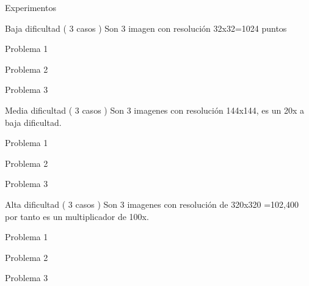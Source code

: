 \documentclass[
  spanish,
  ignorenonframetext,
]{beamer}
\begin{document}
\begin{frame}[fragile]{Experimentos}
\protect\hypertarget{experimentos}{}
\begin{block}{Baja dificultad ( 3 casos )}
\protect\hypertarget{baja-dificultad-3-casos}{}
Son 3 imagen con resolución 32x32=1024 puntos

\begin{block}{Problema 1}
\protect\hypertarget{problema-1}{}
\end{block}

\begin{block}{Problema 2}
\protect\hypertarget{problema-2}{}
\end{block}

\begin{block}{Problema 3}
\protect\hypertarget{problema-3}{}
\end{block}
\end{block}

\begin{block}{Media dificultad ( 3 casos )}
\protect\hypertarget{media-dificultad-3-casos}{}
Son 3 imagenes con resolución 144x144, es un 20x a baja dificultad.

\begin{block}{Problema 1}
\protect\hypertarget{problema-1-1}{}
\end{block}

\begin{block}{Problema 2}
\protect\hypertarget{problema-2-1}{}
\end{block}

\begin{block}{Problema 3}
\protect\hypertarget{problema-3-1}{}
\end{block}
\end{block}

\begin{block}{Alta dificultad ( 3 casos )}
\protect\hypertarget{alta-dificultad-3-casos}{}
Son 3 imagenes con resolución de 320x320 =102,400 por tanto es un
multiplicador de 100x.

\begin{block}{Problema 1}
\protect\hypertarget{problema-1-2}{}
\end{block}

\begin{block}{Problema 2}
\protect\hypertarget{problema-2-2}{}
\end{block}

\begin{block}{Problema 3}
\protect\hypertarget{problema-3-2}{}
\end{block}
\end{block}


\end{frame}
\end{document}
